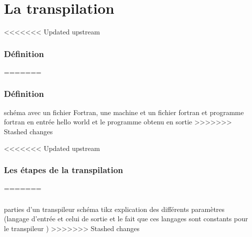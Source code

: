 \section{La transpilation}

\begin{frame}
<<<<<<< Updated upstream
    \frametitle{Définition}
    
=======
    \frametitle{Définition\esp}
    schéma avec un fichier Fortran, une machine et un fichier fortran
    et 
    programme fortran en entrée hello world et le programme obtenu en sortie 
>>>>>>> Stashed changes
\end{frame}


\begin{frame}
<<<<<<< Updated upstream

    \frametitle{Les étapes de la transpilation}

   
=======
    \frametitle{\esp}
    parties d'un transpileur
    schéma tikz explication des différents paramètres (langage d'entrée et celui de sortie et le fait que ces langages sont constants pour le transpileur ) 
>>>>>>> Stashed changes
\end{frame}

